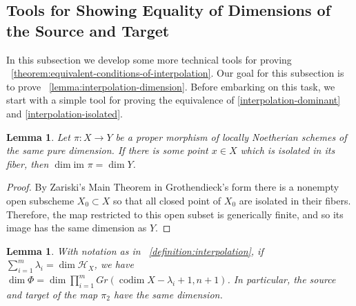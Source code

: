 \documentclass[reqno, 11pt]{amsart}
\theoremstyle{definition}
\theoremstyle{remark}
\numberwithin{equation}{section}
\numberwithin{thm}{section}
\numberwithin{prop}{section}
\numberwithin{lem}{section}
\numberwithin{cor}{section}
\numberwithin{conj}{section}
\numberwithin{defn}{section}
\theoremstyle{plain}
\newtheorem{lemma}[theorem]{Lemma}
\theoremstyle{definition}
\newcommand\ssec{\subsection}
\newcommand\sch{\mathscr H}
\newcommand \ra{\rightarrow}
\newcommand\im{\text{im }}
\newcommand \hilb[1]{\sch_{#1}}
\DeclareMathOperator\codim{codim}
\begin{document}
\ssec{Tools for Showing Equality of Dimensions of the Source and Target}
\label{ssec:tools-dimensions}

In this subsection we develop some more technical tools for proving
~\autoref{theorem:equivalent-conditions-of-interpolation}.
Our goal for this subsection is to prove ~\autoref{lemma:interpolation-dimension}.
Before embarking on this task, we start with a simple tool for proving the equivalence of
\ref{interpolation-dominant} and \ref{interpolation-isolated}.

\begin{lemma}
	\label{lemma:isolated-fiber-implies-dominant}
	Let $\pi: X \ra Y$ be a proper morphism of locally Noetherian schemes of the same pure dimension. If there is some point $x \in X$ which is isolated in its fiber, then $\dim \im \pi = \dim Y$.
\end{lemma}
\begin{proof}
By Zariski's Main Theorem in Grothendieck's form 
	\cite[Theorem 29.6.1(a)]{vakil:foundations-of-algebraic-geometry}
	there is a nonempty open subscheme $X_0 \subset X$ so that all closed point
	of $X_0$ are isolated in their fibers.
	Therefore, the map restricted to this open subset
	is generically finite, and so
	its image has the same dimension as $Y$.
\end{proof}
\begin{lemma}
	\label{lemma:interpolation-dimension}
	With notation as in ~\autoref{definition:interpolation}, 
	if $\sum_{i=1}^m \lambda_i = \dim \hilb X$, we have $\dim \Phi = \dim \prod_{i=1}^m Gr(\codim X - \lambda_i +1, n+1)$.
	In particular, the source and target of the map $\pi_2$ have the same dimension.
\end{lemma}
\end{document}
